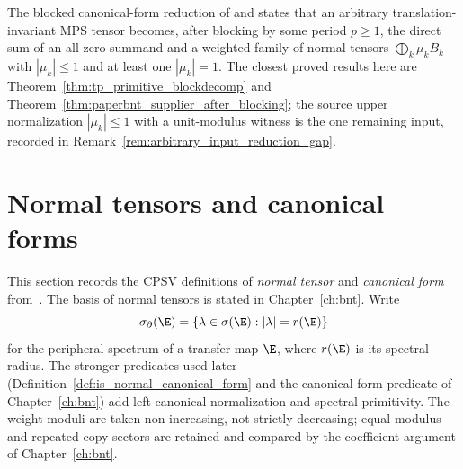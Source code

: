 \begin{remark}%
    \label{rem:cpgsv_canonical_form_source}
    The blocked canonical-form reduction of
    \cite[Section~2.3]{Cirac2016MPDO_arXiv} and
    \cite[Section~IV.A]{Cirac2021Matrix} states that an arbitrary
    translation-invariant MPS tensor becomes, after blocking by some period
    $p\ge 1$, the direct sum of an all-zero summand and a weighted family of
    normal tensors $\bigoplus_k \mu_k B_k$ with $|\mu_k|\le 1$ and at least one
    $|\mu_k|=1$. The closest proved results here are
    Theorem~\ref{thm:tp_primitive_blockdecomp} and
    Theorem~\ref{thm:paperbnt_supplier_after_blocking}; the source upper
    normalization $|\mu_k|\le 1$ with a unit-modulus witness is the one
    remaining input, recorded in
    Remark~\ref{rem:arbitrary_input_reduction_gap}.
\end{remark}

\section{Normal tensors and canonical forms}\label{sec:cpsv_canonical_defs}

This section records the CPSV definitions of \emph{normal tensor} and
\emph{canonical form} from~\cite{Cirac2016MPDO_arXiv}. The basis of normal
tensors is stated in Chapter~\ref{ch:bnt}. Write
\[
    \sigma_\partial(\E) = \{\lambda \in \sigma(\E) : |\lambda| = r(\E)\}
\]
for the peripheral spectrum of a transfer map $\E$, where $r(\E)$ is its
spectral radius. The stronger predicates used later
(Definition~\ref{def:is_normal_canonical_form} and the canonical-form predicate
of Chapter~\ref{ch:bnt}) add left-canonical normalization and spectral
primitivity. The weight moduli are taken non-increasing, not strictly
decreasing; equal-modulus and repeated-copy sectors are retained and compared by
the coefficient argument of Chapter~\ref{ch:bnt}.

